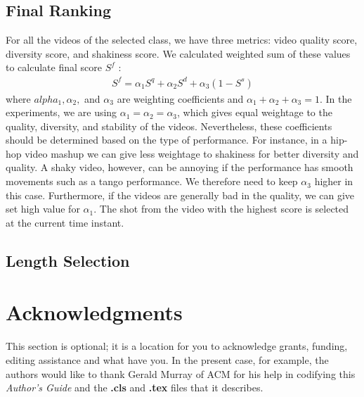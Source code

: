 \documentclass{sig-alternate-05-2015}
\begin{document}
\subsection{Final Ranking}

For all the videos of the selected class, we have three metrics:
video quality score, diversity score, and shakiness score. We calculated
weighted sum of these values to calculate final score $S^f$ :
\begin{eqnarray}
S^f=\alpha_1S^q+\alpha_2S^d+\alpha_3(1-S^s)
\end{eqnarray}
where $alpha_1, \alpha_2,$ and $\alpha_3$ are weighting coefficients and $\alpha_1 + \alpha_2 + \alpha_3 = 1$. In the experiments, we are using $\alpha_1 = \alpha_2 = \alpha_3$, which gives equal weightage to the quality, diversity, and stability
of the videos. Nevertheless, these coefficients should be determined
based on the type of performance. For instance, in a hip-hop
video mashup we can give less weightage to shakiness for better diversity
and quality. A shaky video, however, can be annoying if the
performance has smooth movements such as a tango performance.
We therefore need to keep $\alpha_3$ higher in this case. Furthermore, if
the videos are generally bad in the quality, we can give set high
value for $\alpha_1$. The shot from the video with the highest score is
selected at the current time instant.

\subsection{Length Selection}

\section{Acknowledgments}
This section is optional; it is a location for you
to acknowledge grants, funding, editing assistance and
what have you.  In the present case, for example, the
authors would like to thank Gerald Murray of ACM for
his help in codifying this \textit{Author's Guide}
and the \textbf{.cls} and \textbf{.tex} files that it describes.

%

%
%
\appendix
\end{document}
